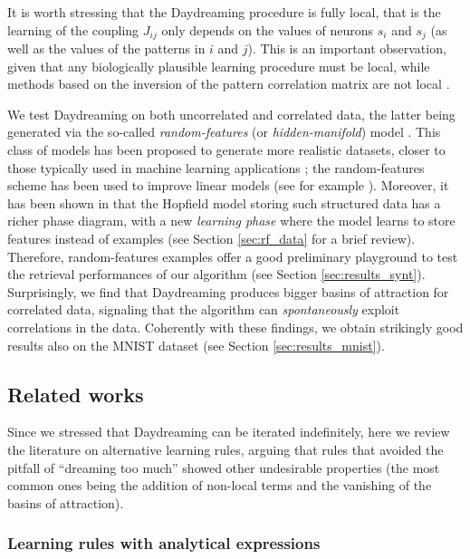 \documentclass[a4paper]{cas-sc}
\begin{document}
It is worth stressing that the Daydreaming procedure is fully local, that is the learning of the coupling $J_{ij}$ only depends on the values of neurons $s_i$ and $s_j$ (as well as the values of the patterns in $i$ and $j$). This is an important observation, given that any biologically plausible learning procedure must be local, while methods based on the inversion of the pattern correlation matrix are not local \cite{personnaz1985information, kanter1987associative}.

We test Daydreaming on both uncorrelated and correlated data, the latter being generated via the so-called \emph{random-features} (or \emph{hidden-manifold}) model \cite{goldt2020modeling}. This class of models has been proposed to generate more realistic datasets, closer to those typically used in machine learning applications \cite{gerace2022probing,baldassi2022learning}; the random-features scheme has been used to improve linear models (see for example \cite{rahimi2007random,louart2018random, mei2022generalization}). Moreover, it has been shown in \cite{negri2023storage} that the Hopfield model storing such structured data has a richer phase diagram, with a new \emph{learning phase} where the model learns to store features instead of examples (see Section \ref{sec:rf_data} for a brief review).
Therefore, random-features examples offer a good preliminary playground to test the retrieval performances of our algorithm (see Section \ref{sec:results_synt}). Surprisingly, we find that Daydreaming produces bigger basins of attraction for correlated data, signaling that the algorithm can \emph{spontaneously} exploit correlations in the data. Coherently with these findings, we obtain strikingly good results also on the MNIST dataset (see Section \ref{sec:results_mnist}). 


\subsection{Related works}

Since we stressed that Daydreaming can be iterated indefinitely, here we review the literature on alternative learning rules, arguing that rules that avoided the pitfall of ``dreaming too much'' showed other undesirable properties (the most common ones being the addition of non-local terms and the vanishing of the basins of attraction).

\subsubsection{Learning rules with analytical expressions}
\label{subsubsec:analytic_rules}
\end{document}
